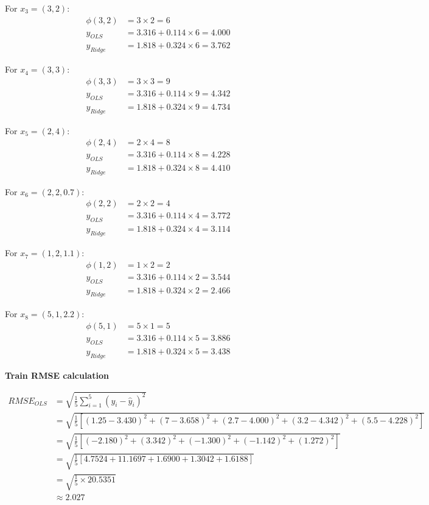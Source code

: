\documentclass{article}
\begin{document}
\begin{enumerate}[leftmargin=\labelsep]
For $x_3 = (3, 2)$:
\begin{align*}
\phi(3, 2) &= 3 \times 2 = 6 \\
y_{OLS} &= 3.316 + 0.114 \times 6 = 4.000 \\
y_{Ridge} &= 1.818 + 0.324 \times 6 = 3.762
\end{align*}

For $x_4 = (3, 3)$:
\begin{align*}
\phi(3, 3) &= 3 \times 3 = 9 \\
y_{OLS} &= 3.316 + 0.114 \times 9 = 4.342 \\
y_{Ridge} &= 1.818 + 0.324 \times 9 = 4.734
\end{align*}

For $x_5 = (2, 4)$:
\begin{align*}
\phi(2, 4) &= 2 \times 4 = 8 \\
y_{OLS} &= 3.316 + 0.114 \times 8 = 4.228 \\
y_{Ridge} &= 1.818 + 0.324 \times 8 = 4.410
\end{align*}


For $x_6 = (2, 2, 0.7)$:
\begin{align*}
\phi(2, 2) &= 2 \times 2 = 4 \\
y_{OLS} &= 3.316 + 0.114 \times 4 = 3.772 \\
y_{Ridge} &= 1.818 + 0.324 \times 4 = 3.114
\end{align*}

For $x_7 = (1, 2, 1.1)$:
\begin{align*}
\phi(1, 2) &= 1 \times 2 = 2 \\
y_{OLS} &= 3.316 + 0.114 \times 2 = 3.544 \\
y_{Ridge} &= 1.818 + 0.324 \times 2 = 2.466
\end{align*}

For $x_8 = (5, 1, 2.2)$:
\begin{align*}
\phi(5, 1) &= 5 \times 1 = 5 \\
y_{OLS} &= 3.316 + 0.114 \times 5 = 3.886 \\
y_{Ridge} &= 1.818 + 0.324 \times 5 = 3.438
\end{align*}

\textbf{Train RMSE calculation}

\begin{align*}
RMSE_{OLS} &= \sqrt{\frac{1}{5}\sum_{i=1}^5 (y_i - \hat{y}_i)^2} \\
&= \sqrt{\frac{1}{5}[(1.25 - 3.430)^2 + (7 - 3.658)^2 + (2.7 - 4.000)^2 + (3.2 - 4.342)^2 + (5.5 - 4.228)^2]} \\
&= \sqrt{\frac{1}{5}[(-2.180)^2 + (3.342)^2 + (-1.300)^2 + (-1.142)^2 + (1.272)^2]} \\
&= \sqrt{\frac{1}{5}[4.7524 + 11.1697 + 1.6900 + 1.3042 + 1.6188]} \\
&= \sqrt{\frac{1}{5} \times 20.5351} \\
&\approx 2.027
\end{align*}


\end{enumerate}
\end{document}
